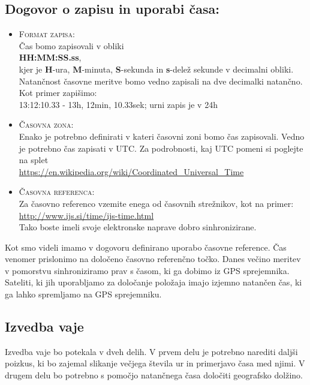 \documentclass[11pt]{article}
\begin{document}
\subsection{Dogovor o zapisu in uporabi časa:}
\begin{itemize}
	\item \textsc{Format zapisa}:\\[2mm]
	Čas bomo zapisovali v obliki\\[2mm] 
	\textbf{HH:MM:SS.ss},\\[2mm]
	kjer je \textbf{H}-ura, \textbf{M}-minuta, \textbf{S}-sekunda in \textbf{s}-delež sekunde v decimalni obliki. Natančnost časovne meritve bomo vedno zapisali na dve decimalki natančno. Kot primer zapišimo:\\[2mm] 
	13:12:10.33 - 13h, 12min, 10.33sek; urni zapis je v 24h\\
	\item \textsc{Časovna zona}:\\[2mm]
	Enako je potrebno definirati v kateri časovni zoni bomo čas zapisovali. Vedno je potrebno čas zapisati v UTC. Za podrobnosti, kaj UTC pomeni si poglejte na splet\\[2mm] \url{https://en.wikipedia.org/wiki/Coordinated_Universal_Time}\\
	
	\item \textsc{Časovna referenca}:\\[2mm]
	Za časovno referenco vzemite enega od časovnih strežnikov, kot na primer:\\[2mm]
	\url{http://www.ijs.si/time/ijs-time.html}\\[2mm]
	Tako boste imeli svoje elektronske naprave dobro sinhronizirane.\\
\end{itemize}

Kot smo videli imamo v dogovoru definirano uporabo časovne reference. Čas venomer prislonimo na določeno časovno referenčno točko. Danes večino meritev v pomorstvu sinhroniziramo prav s časom, ki ga dobimo iz GPS sprejemnika. Sateliti, ki jih uporabljamo za določanje položaja imajo izjemno natančen čas, ki ga lahko spremljamo na GPS sprejemniku.



\subsection{Izvedba vaje}
Izvedba vaje bo potekala v dveh delih. V prvem delu je potrebno narediti daljši poizkus, ki bo zajemal slikanje večjega števila ur in primerjavo časa med njimi. V drugem delu bo potrebno s pomočjo natančnega časa določiti geografsko dolžino.
\end{document}
